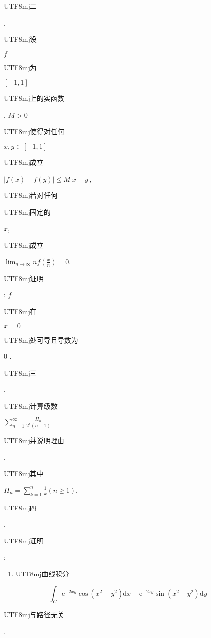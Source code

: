 \documentclass[10pt]{article}
\begin{document}
\begin{CJK}{UTF8}{mj}二\end{CJK}. \begin{CJK}{UTF8}{mj}设\end{CJK} $f$ \begin{CJK}{UTF8}{mj}为\end{CJK} $[-1,1]$ \begin{CJK}{UTF8}{mj}上的实函数\end{CJK}, $M>0$ \begin{CJK}{UTF8}{mj}使得对任何\end{CJK} $x, y \in[-1,1]$ \begin{CJK}{UTF8}{mj}成立\end{CJK} $|f(x)-f(y)| \leqslant M|x-y|$, \begin{CJK}{UTF8}{mj}若对任何\end{CJK} \begin{CJK}{UTF8}{mj}固定的\end{CJK} $x$, \begin{CJK}{UTF8}{mj}成立\end{CJK} $\lim _{n \rightarrow \infty} n f\left(\frac{x}{n}\right)=0$. \begin{CJK}{UTF8}{mj}证明\end{CJK}: $f$ \begin{CJK}{UTF8}{mj}在\end{CJK} $x=0$ \begin{CJK}{UTF8}{mj}处可导且导数为\end{CJK} 0 .

\begin{CJK}{UTF8}{mj}三\end{CJK}. \begin{CJK}{UTF8}{mj}计算级数\end{CJK} $\sum_{n=1}^{\infty} \frac{H_{n}}{2^{n}(n+1)}$ \begin{CJK}{UTF8}{mj}并说明理由\end{CJK}, \begin{CJK}{UTF8}{mj}其中\end{CJK} $H_{n}=\sum_{k=1}^{n} \frac{1}{k}(n \geqslant 1)$.

\begin{CJK}{UTF8}{mj}四\end{CJK}. \begin{CJK}{UTF8}{mj}证明\end{CJK}:

\begin{enumerate}
  \item \begin{CJK}{UTF8}{mj}曲线积分\end{CJK}
\end{enumerate}
$$
\int_{C} \mathrm{e}^{-2 x y} \cos \left(x^{2}-y^{2}\right) \mathrm{d} x-\mathrm{e}^{-2 x y} \sin \left(x^{2}-y^{2}\right) \mathrm{d} y
$$
\begin{CJK}{UTF8}{mj}与路径无关\end{CJK}.
\end{document}
